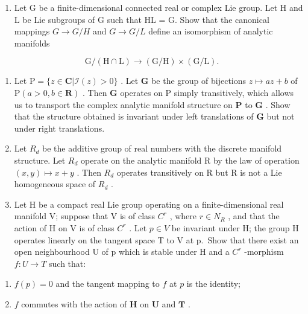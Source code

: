 
\begin{enumerate}
\def\labelenumi{\arabic{enumi}.}
\tightlist
\item
  Let G be a finite-dimensional connected real or complex Lie group. Let H and L be Lie subgroups of G such that HL = G. Show that the canonical mappings \(G \rightarrow G/H\) and \(G \rightarrow G/L\) define an isomorphism of analytic manifolds
\end{enumerate}

\[
\mathrm{G} / (\mathrm{H} \cap \mathrm{L}) \rightarrow (\mathrm{G} / \mathrm{H}) \times (\mathrm{G} / \mathrm{L}).
\]

\begin{enumerate}
\def\labelenumi{\arabic{enumi}.}
\setcounter{enumi}{1}
\item
  Let \(\mathrm{P} = \{z\in \mathbf{C}|\mathcal{I}(z) > 0\}\) . Let \(\mathbf{G}\) be the group of bijections \(z\mapsto az + b\) of \(\mathrm{P}(a > 0,b\in \mathbf{R})\) . Then \(\mathbf{G}\) operates on \(\mathrm{P}\) simply transitively, which allows us to transport the complex analytic manifold structure on \(\mathbf{P}\) to \(\mathbf{G}\) . Show that the structure obtained is invariant under left translations of \(\mathbf{G}\) but not under right translations.
\item
  Let \(R_{d}\) be the additive group of real numbers with the discrete manifold structure. Let \(R_{d}\) operate on the analytic manifold R by the law of operation \((x,y)\mapsto x+y\) . Then \(R_{d}\) operates transitively on R but R is not a Lie homogeneous space of \(R_{d}\) .
\item
  Let H be a compact real Lie group operating on a finite-dimensional real manifold V; suppose that V is of class \(C^{r}\) , where \(r \in N_{R}\) , and that the action of H on V is of class \(C^{r}\) . Let \(p \in V\) be invariant under H; the group H operates linearly on the tangent space T to V at p.~Show that there exist an open neighbourhood U of p which is stable under H and a \(C^{r}\) -morphism \(f: U \to T\) such that:
\end{enumerate}

\begin{enumerate}
\def\labelenumi{(\alph{enumi})}
\item
  \(f(p) = 0\) and the tangent mapping to \(f\) at \(p\) is the identity;
\item
  \(f\) commutes with the action of \(\mathbf{H}\) on \(\mathbf{U}\) and \(\mathbf{T}\) .
\end{enumerate}

